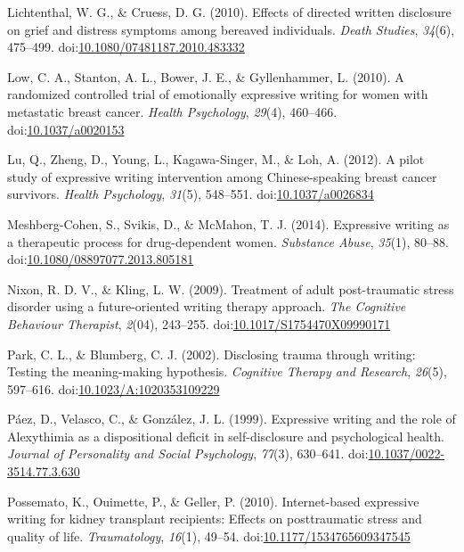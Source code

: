 \documentclass[man]{apa6}
\theoremstyle{definition}
\theoremstyle{definition}
\theoremstyle{definition}
\theoremstyle{remark}
\begin{document}
\leavevmode\hypertarget{ref-Lichtenthal2010}{}%
Lichtenthal, W. G., \& Cruess, D. G. (2010). Effects of directed written
disclosure on grief and distress symptoms among bereaved individuals.
\emph{Death Studies}, \emph{34}(6), 475--499.
doi:\href{https://doi.org/10.1080/07481187.2010.483332}{10.1080/07481187.2010.483332}

\leavevmode\hypertarget{ref-Low2010}{}%
Low, C. A., Stanton, A. L., Bower, J. E., \& Gyllenhammer, L. (2010). A
randomized controlled trial of emotionally expressive writing for women
with metastatic breast cancer. \emph{Health Psychology}, \emph{29}(4),
460--466. doi:\href{https://doi.org/10.1037/a0020153}{10.1037/a0020153}

\leavevmode\hypertarget{ref-Lu2012a}{}%
Lu, Q., Zheng, D., Young, L., Kagawa-Singer, M., \& Loh, A. (2012). A
pilot study of expressive writing intervention among Chinese-speaking
breast cancer survivors. \emph{Health Psychology}, \emph{31}(5),
548--551. doi:\href{https://doi.org/10.1037/a0026834}{10.1037/a0026834}

\leavevmode\hypertarget{ref-Meshberg-Cohen2014}{}%
Meshberg-Cohen, S., Svikis, D., \& McMahon, T. J. (2014). Expressive
writing as a therapeutic process for drug-dependent women.
\emph{Substance Abuse}, \emph{35}(1), 80--88.
doi:\href{https://doi.org/10.1080/08897077.2013.805181}{10.1080/08897077.2013.805181}

\leavevmode\hypertarget{ref-Nixon2009}{}%
Nixon, R. D. V., \& Kling, L. W. (2009). Treatment of adult
post-traumatic stress disorder using a future-oriented writing therapy
approach. \emph{The Cognitive Behaviour Therapist}, \emph{2}(04),
243--255.
doi:\href{https://doi.org/10.1017/S1754470X09990171}{10.1017/S1754470X09990171}

\leavevmode\hypertarget{ref-Park2002}{}%
Park, C. L., \& Blumberg, C. J. (2002). Disclosing trauma through
writing: Testing the meaning-making hypothesis. \emph{Cognitive Therapy
and Research}, \emph{26}(5), 597--616.
doi:\href{https://doi.org/10.1023/A:1020353109229}{10.1023/A:1020353109229}

\leavevmode\hypertarget{ref-Paez1999}{}%
Páez, D., Velasco, C., \& González, J. L. (1999). Expressive writing and
the role of Alexythimia as a dispositional deficit in self-disclosure
and psychological health. \emph{Journal of Personality and Social
Psychology}, \emph{77}(3), 630--641.
doi:\href{https://doi.org/10.1037/0022-3514.77.3.630}{10.1037/0022-3514.77.3.630}

\leavevmode\hypertarget{ref-Possemato2010}{}%
Possemato, K., Ouimette, P., \& Geller, P. (2010). Internet-based
expressive writing for kidney transplant recipients: Effects on
posttraumatic stress and quality of life. \emph{Traumatology},
\emph{16}(1), 49--54.
doi:\href{https://doi.org/10.1177/1534765609347545}{10.1177/1534765609347545}
\end{document}
